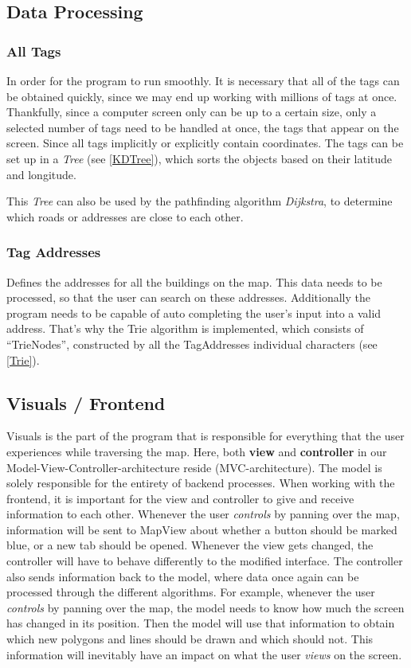\subsection{Data Processing}

\subsubsection{All Tags}
In order for the program to run smoothly. It is necessary that all of the tags can be obtained quickly, since we may end up working with millions of tags at once. Thankfully, since a computer screen only can be up to a certain size, only a selected number of tags need to be handled at once, the tags that appear on the screen. Since all tags implicitly or explicitly contain coordinates. The tags can be set up in a \textit{Tree} (see \ref{KDTree}), which sorts the objects based on their latitude and longitude.

This \textit{Tree} can also be used by the pathfinding algorithm \textit{Dijkstra}, to determine which roads or addresses are close to each other.

\subsubsection{Tag Addresses}
Defines the addresses for all the buildings on the map. This data needs to be processed, so that the user can search on these addresses. Additionally the program needs to be capable of auto completing the user’s input into a valid address. That’s why the Trie algorithm is implemented, which consists of “TrieNodes”, constructed by all the TagAddresses individual characters (see \ref{Trie}). 


\subsection{Visuals / Frontend}

Visuals is the part of the program that is responsible for everything that the user experiences while traversing the map. Here, both \textbf{view }and \textbf{controller }in our Model-View-Controller-architecture reside (MVC-architecture). The model is solely responsible for the entirety of backend processes. 
When working with the frontend, it is important for the view and controller to give and receive information to each other. Whenever the user \textit{controls }by panning over the map, information will be sent to MapView about whether a button should be marked blue, or a new tab should be opened. Whenever the view gets changed, the controller will have to behave differently to the modified interface. The controller also sends information back to the model, where data once again can be processed through the different algorithms.
For example, whenever the user \textit{controls }by panning over the map, the model needs to know how much the screen has changed in its position. Then the model will use that information to obtain which new polygons and lines should be drawn and which should not. This information will inevitably have an impact on what the user \textit{views }on the screen. 

